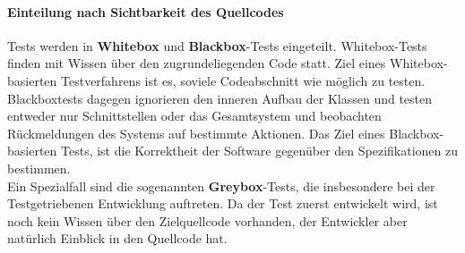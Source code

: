 \paragraph{Einteilung nach Sichtbarkeit des Quellcodes} Tests werden in \textbf{Whitebox} und \textbf{Blackbox}-Tests eingeteilt.
Whitebox-Tests finden mit Wissen über den zugrundeliegenden Code statt. Ziel eines Whitebox-basierten Testverfahrens ist es, soviele Codeabschnitt wie möglich zu testen.\\
Blackboxtests dagegen ignorieren den inneren Aufbau der Klassen und testen entweder nur Schnittstellen oder das Gesamtsystem und beobachten Rückmeldungen des Systems auf bestimmte Aktionen. Das Ziel eines Blackbox-basierten Tests, ist die Korrektheit der Software gegenüber den Spezifikationen zu bestimmen.\\
Ein Spezialfall sind die sogenannten \textbf{Greybox}-Tests, die insbesondere bei der Testgetriebenen Entwicklung auftreten. Da der Test zuerst entwickelt wird, ist noch kein Wissen über den Zielquellcode vorhanden, der Entwickler aber natürlich Einblick in den Quellcode hat.

